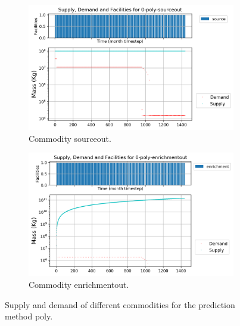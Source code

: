 \documentclass[11pt]{article}
\begin{document}
\begin{figure}[H]
	\centering
	\begin{subfigure}[]{0.45\textwidth}
		\centering
		\includegraphics[width=\linewidth]{29-figures/0-poly-sourceout.png} 
		\caption{Commodity sourceout.}
		\label{fig:29-sourceout}
	\end{subfigure}
	\vspace{1cm}
	\begin{subfigure}[]{0.45\textwidth}
		\centering
		\includegraphics[width=\linewidth]{29-figures/0-poly-enrichmentout.png} 
		\caption{Commodity enrichmentout.}
		\label{fig:29-enrichmentout}
	\end{subfigure}
	\hfill
	\caption{Supply and demand of different commodities for the prediction method poly.}
	\label{fig:29-front}
\end{figure}
\end{document}
